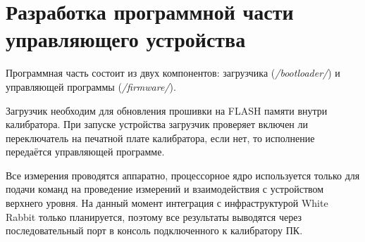 \chapter{Разработка программной части управляющего устройства}

Программная часть состоит из двух компонентов: загрузчика (\emph{/bootloader/}) и управляющей программы (\emph{/firmware/}).

Загрузчик необходим для обновления прошивки на FLASH памяти внутри калибратора. При запуске устройства загрузчик проверяет
включен ли переключатель на печатной плате калибратора, если нет, то исполнение передаётся управляющей программе.

Все измерения проводятся аппаратно, процессорное ядро используется только для подачи команд на проведение измерений и
взаимодействия с устройством верхнего уровня. На данный момент интеграция с инфраструктурой White Rabbit только планируется,
поэтому все результаты выводятся через последовательный порт в консоль подключенного к калибратору ПК.



\newpage
